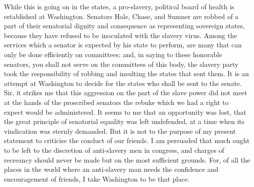 While this is going on in the states, a pro-slavery, political board of
health is established at Washington. Senators Hale, Chase, and Sumner
are robbed of a part of their senatorial dignity and consequence as
representing sovereign states, because they have refused to be
inoculated with the slavery virus. Among the services which a senator is
expected by his state to perform, are many that can only be done
efficiently on committees; and, in saying to these honorable senators,
you shall not serve on the committees of this body,
{\protect\hypertarget{454}{}{}}the slavery party took the responsibility
of robbing and insulting the states that sent them. It is an attempt at
Washington to decide for the states who shall be sent to the senate.
Sir, it strikes me that this aggression on the part of the slave power
did not meet at the hands of the proscribed senators the rebuke which we
had a right to expect would be administered. It seems to me that an
opportunity was lost, that the great principle of senatorial equality
was left undefended, at a time when its vindication was sternly
demanded. But it is not to the purpose of my present statement to
criticise the conduct of our friends. I am persuaded that much ought to
be left to the discretion of anti-slavery men in congress, and charges
of recreancy should never be made but on the most sufficient grounds.
For, of all the places in the world where an anti-slavery man needs the
confidence and encouragement of friends, I take Washington to be that
place.


